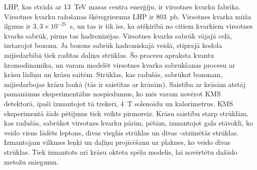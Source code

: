 LHP, kas strādā ar 13~TeV masas centra enerģiju, ir virsotnes kvarku fabrika. Virsotnes kvarku ražošanas šķērsgriezums LHP ir 803~pb. Virsotnes kvarka mūža ilgums ir $3,3\times10^{-25}$~s, un tas ir tik īss, ka atšķirībā no citiem kvarkiem virsotnes kvarks sabrūk, pirms tas hadronizējas. Virsotnes kvarks sabrūk vājajā ceļā, izstarojot \PW bozonu. Ja \PW bozons sabrūk hadroniskajā veidā, stiprajā kodola mijiedarbībā tiek radītas daļiņu strūklas. Šo procesu apraksta kvantu hromodinamika, un varam modelēt virsotnes kvarka sabrukšanas procesu ar krāsu lādiņu un krāsu saitēm. Strūklas, kas radušās, sabrūkot \PW bozonam, mijiedarbojas krāsu laukā (tās ir saistītas ar krāsām). Saistība ar krāsām atstāj pamanāmus eksperimentālus nospiedumus, ko mēs varam novērot KMS detektorā, īpaši izmantojot tā trekeri, 4~T solenoīdu un kalorimetrus. KMS eksperimentā šāds pētījums tiek veikts pirmoreiz. Krāsu saistību starp strūklām, kas radušās, sabrūkot virsotnes kvarku pārim, pētām, izmantojot gala stāvokli, ko veido viens lādēts leptons, divas vieglās strūklas un divas \cPqb-atzīmētās strūklas. Izmantojam vilkmes leņķi un daļiņu projicēšanu uz plaknes, ko veido divas strūklas. Tiek izmantots arī krāsu okteta \PW spēļu modelis, lai novērtētu dažādo metožu sniegumu.
